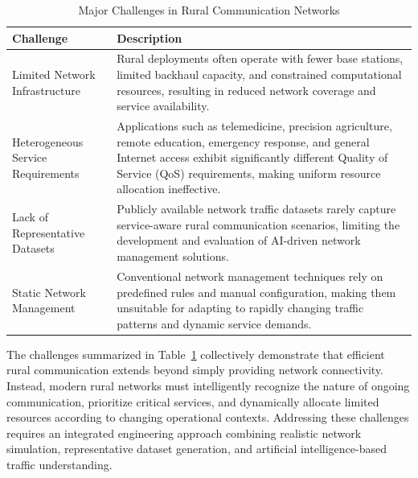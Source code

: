 \documentclass[12pt,a4paper]{report}
\begin{document}
	\begin{table}[H]
		\centering
		\caption{Major Challenges in Rural Communication Networks}
		\label{tab:rural_challenges}
		
		\begin{tabular}{|p{4cm}|p{9cm}|}
			\hline
			
			\textbf{Challenge} &
			\textbf{Description}
			\\
			\hline
			
			Limited Network Infrastructure &
			Rural deployments often operate with fewer base stations, limited backhaul capacity, and constrained computational resources, resulting in reduced network coverage and service availability.
			\\
			\hline
			
			Heterogeneous Service Requirements &
			Applications such as telemedicine, precision agriculture, remote education, emergency response, and general Internet access exhibit significantly different Quality of Service (QoS) requirements, making uniform resource allocation ineffective.
			\\
			\hline
			
			Lack of Representative Datasets &
			Publicly available network traffic datasets rarely capture service-aware rural communication scenarios, limiting the development and evaluation of AI-driven network management solutions.
			\\
			\hline
			
			Static Network Management &
			Conventional network management techniques rely on predefined rules and manual configuration, making them unsuitable for adapting to rapidly changing traffic patterns and dynamic service demands.
			\\
			\hline
			
		\end{tabular}
		
	\end{table}
	
	The challenges summarized in Table~\ref{tab:rural_challenges} collectively demonstrate that efficient rural communication extends beyond simply providing network connectivity. Instead, modern rural networks must intelligently recognize the nature of ongoing communication, prioritize critical services, and dynamically allocate limited resources according to changing operational contexts. Addressing these challenges requires an integrated engineering approach combining realistic network simulation, representative dataset generation, and artificial intelligence-based traffic understanding.
	
\end{document}
